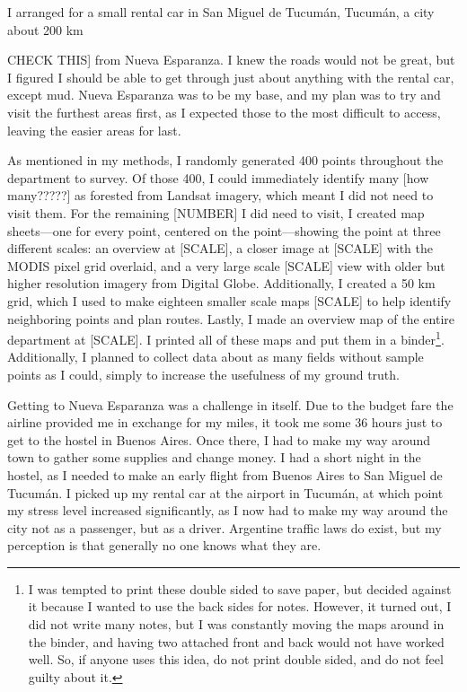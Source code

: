 I arranged for a small rental car in San Miguel de Tucumán, Tucumán, a city about 200 km {CHECK THIS] from Nueva Esparanza. I knew the roads would not be great, but I figured I should be able to get through just about anything with the rental car, except mud. Nueva Esparanza was to be my base, and my plan was to try and visit the furthest areas first, as I expected those to the most difficult to access, leaving the easier areas for last.

As mentioned in my methods, I randomly generated 400 points throughout the department to survey. Of those 400, I could immediately identify many [how many?????] as forested from Landsat imagery, which meant I did not need to visit them. For the remaining [NUMBER] I did need to visit, I created map sheets—one for every point, centered on the point—showing the point at three different scales: an overview at [SCALE], a closer image at [SCALE] with the MODIS pixel grid overlaid, and a very large scale [SCALE] view with older but higher resolution imagery from Digital Globe. Additionally, I created a 50 km grid, which I used to make eighteen smaller scale maps [SCALE] to help identify neighboring points and plan routes. Lastly, I made an overview map of the entire department at [SCALE]. I printed all of these maps and put them in a binder\footnote{I was tempted to print these double sided to save paper, but decided against it because I wanted to use the back sides for notes. However, it turned out, I did not write many notes, but I was constantly moving the maps around in the binder, and having two attached front and back would not have worked well. So, if anyone uses this idea, do not print double sided, and do not feel guilty about it.}. Additionally, I planned to collect data about as many fields without sample points as I could, simply to increase the usefulness of my ground truth.

Getting to Nueva Esparanza was a challenge in itself. Due to the budget fare the airline provided me in exchange for my miles, it took me some 36 hours just to get to the hostel in Buenos Aires. Once there, I had to make my way around town to gather some supplies and change money. I had a short night in the hostel, as I needed to make an early flight from Buenos Aires to San Miguel de Tucumán. I picked up my rental car at the airport in Tucumán, at which point my stress level increased significantly, as I now had to make my way around the city not as a passenger, but as a driver. Argentine traffic laws do exist, but my perception is that generally no one knows what they are.

}
